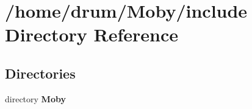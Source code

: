 \section{/home/drum/\-Moby/include Directory Reference}
\label{dir_d44c64559bbebec7f509842c48db8b23}
\subsection*{Directories}
\begin{DoxyCompactItemize}
\item 
directory {\bf Moby}
\end{DoxyCompactItemize}
